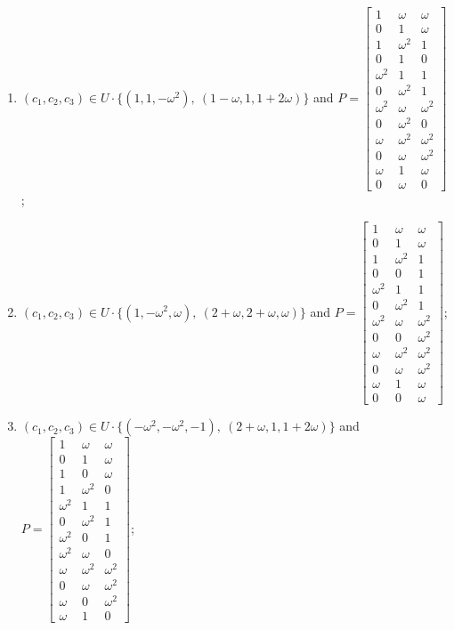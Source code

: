 \begin{enumerate}
\item[(f65)\,\newitem] $(c_1,c_2,c_3)\in U\cdot\{(1,1,-\omega^2),\allowbreak\ (1-\omega,1,1+2\omega)\}$ and $P=\begin{bmatrix}1&\omega&\omega\\0&1&\omega\\1&\omega^2&1\\0&1&0\\\omega^2&1&1\\0&\omega^2&1\\\omega^2&\omega&\omega^2\\0&\omega^2&0\\\omega&\omega^2&\omega^2\\0&\omega&\omega^2\\\omega&1&\omega\\0&\omega&0\end{bmatrix}$;
\item[(f66)\,\newitem] $(c_1,c_2,c_3)\in U\cdot\{(1,-\omega^2,\omega),\allowbreak\ (2+\omega,2+\omega,\omega)\}$ and $P=\begin{bmatrix}1&\omega&\omega\\0&1&\omega\\1&\omega^2&1\\0&0&1\\\omega^2&1&1\\0&\omega^2&1\\\omega^2&\omega&\omega^2\\0&0&\omega^2\\\omega&\omega^2&\omega^2\\0&\omega&\omega^2\\\omega&1&\omega\\0&0&\omega\end{bmatrix}$;
\item[(f67)\,\newitem] $(c_1,c_2,c_3)\in U\cdot\{(-\omega^2,-\omega^2,-1),\allowbreak\ (2+\omega,1,1+2\omega)\}$ and $P=\begin{bmatrix}1&\omega&\omega\\0&1&\omega\\1&0&\omega\\1&\omega^2&0\\\omega^2&1&1\\0&\omega^2&1\\\omega^2&0&1\\\omega^2&\omega&0\\\omega&\omega^2&\omega^2\\0&\omega&\omega^2\\\omega&0&\omega^2\\\omega&1&0\end{bmatrix}$;

\end{enumerate}
